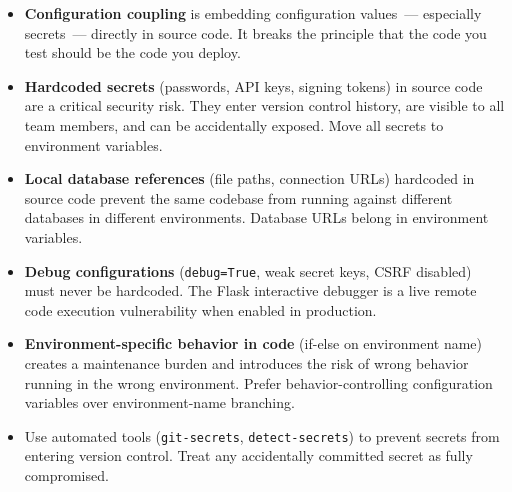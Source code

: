 \label{09-configuration-coupling:key-takeaways}
\begin{takeaways}

\begin{itemize}
\tightlist
\item
  \textbf{Configuration coupling} is embedding configuration values~--- especially secrets~--- directly in source code. It breaks the principle that the code you test should be the code you deploy.
\item
  \textbf{Hardcoded secrets} (passwords, API keys, signing tokens) in source code are a critical security risk. They enter version control history, are visible to all team members, and can be accidentally exposed. Move all secrets to environment variables.
\item
  \textbf{Local database references} (file paths, connection URLs) hardcoded in source code prevent the same codebase from running against different databases in different environments. Database URLs belong in environment variables.
\item
  \textbf{Debug configurations} (\texttt{debug=True}, weak secret keys, CSRF disabled) must never be hardcoded. The Flask interactive debugger is a live remote code execution vulnerability when enabled in production.
\item
  \textbf{Environment-specific behavior in code} (if-else on environment name) creates a maintenance burden and introduces the risk of wrong behavior running in the wrong environment. Prefer behavior-controlling configuration variables over environment-name branching.
\item
  Use automated tools (\texttt{git-secrets}, \texttt{detect-secrets}) to prevent secrets from entering version control. Treat any accidentally committed secret as fully compromised.
\end{itemize}

\end{takeaways}

\label{09-configuration-coupling:exercises}

